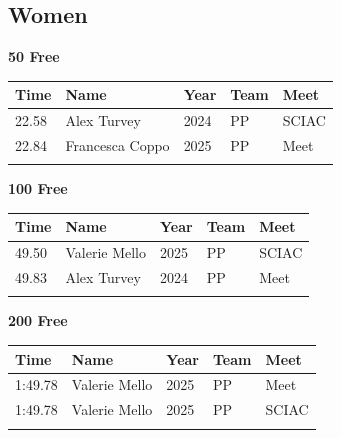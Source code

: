 
\clearpage
{}

\clearpage
\subsection{Women}
\vspace{1.2em}
\noindent\begin{minipage}[t]{0.98\textwidth}
\centering
\textbf{\textcolor{teamprimary}{50 Free}}\par
\vspace{0.5em}
\centering
\small
\renewcommand{\arraystretch}{1.0}
\setlength{\tabcolsep}{4pt}
\begin{tabular}{@{}p{2.5cm}p{4.5cm}p{1.5cm}p{2.5cm}p{2.5cm}@{}}
\toprule
\textbf{Time} & \textbf{Name} & \textbf{Year} & \textbf{Team} & \textbf{Meet} \\
\midrule
22.58 & Alex Turvey & 2024 & PP & SCIAC \\
22.84 & Francesca Coppo & 2025 & PP & Meet \\
\bottomrule
\vspace{0.5em}
\end{tabular}
\end{minipage}
\vspace{1.2em}
\noindent\begin{minipage}[t]{0.98\textwidth}
\centering
\textbf{\textcolor{teamprimary}{100 Free}}\par
\vspace{0.5em}
\centering
\small
\renewcommand{\arraystretch}{1.0}
\setlength{\tabcolsep}{4pt}
\begin{tabular}{@{}p{2.5cm}p{4.5cm}p{1.5cm}p{2.5cm}p{2.5cm}@{}}
\toprule
\textbf{Time} & \textbf{Name} & \textbf{Year} & \textbf{Team} & \textbf{Meet} \\
\midrule
49.50 & Valerie Mello & 2025 & PP & SCIAC \\
49.83 & Alex Turvey & 2024 & PP & Meet \\
\bottomrule
\vspace{0.5em}
\end{tabular}
\end{minipage}
\vspace{1.2em}
\noindent\begin{minipage}[t]{0.98\textwidth}
\centering
\textbf{\textcolor{teamprimary}{200 Free}}\par
\vspace{0.5em}
\centering
\small
\renewcommand{\arraystretch}{1.0}
\setlength{\tabcolsep}{4pt}
\begin{tabular}{@{}p{2.5cm}p{4.5cm}p{1.5cm}p{2.5cm}p{2.5cm}@{}}
\toprule
\textbf{Time} & \textbf{Name} & \textbf{Year} & \textbf{Team} & \textbf{Meet} \\
\midrule
1:49.78 & Valerie Mello & 2025 & PP & Meet \\
1:49.78 & Valerie Mello & 2025 & PP & SCIAC \\
\bottomrule
\vspace{0.5em}
\end{tabular}
\end{minipage}

